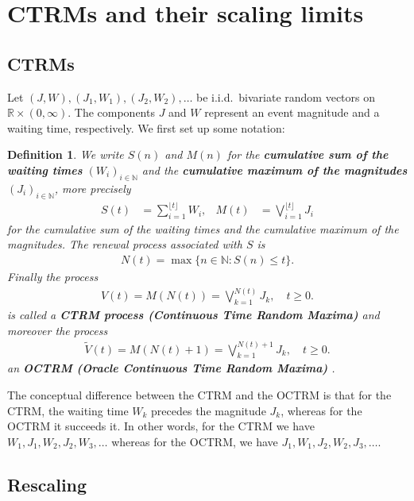 \documentclass[12pt, a4paper]{article}
\newtheorem{definition}[equation]{Definition}
\newcommand{\N}{\mathbb{N}}
\newcommand{\1}{\mathbf 1}
\begin{document}
\section{CTRMs and their scaling limits}

\subsection{CTRMs}

Let $(J,W),(J_1,W_1),(J_2,W_2), \ldots$ 
be i.i.d.\ bivariate random vectors on $\mathbb R \times (0, \infty)$. 
The components $J$ and $W$ represent an event magnitude and 
a waiting time, respectively. 
We first set up some notation: 


\begin{definition}
We write $S(n)$ and $M(n)$ for the \textbf{cumulative sum of the waiting times} $(W_i)_{i \in \N}$ and the \textbf{cumulative maximum of the magnitudes} $(J_i)_{i \in \N}$, more precisely 
\begin{align}
S(t) &= \sum_{i=1}^{\lfloor t \rfloor} W_i, 
&
M(t) &= \bigvee_{i=1}^{\lfloor t \rfloor} J_i
\end{align} 
for the cumulative sum of the waiting times and the cumulative maximum of the 
magnitudes. 
The renewal process associated with $S$ is 
\begin{align} \label{eq:renewal-process}
N(t) = \max\{n \in \mathbb N: S(n) \le t\}.
\end{align}
Finally the process
\begin{align}
V(t) 
= M\left( N(t) \right) 
= \bigvee_{k=1}^{N(t)} J_k, \quad t \ge 0.
\end{align}
is called a \textbf{CTRM process (Continuous Time Random Maxima)} and moreover the process
\begin{align}
\tilde V(t) 
= M\left( N(t) + 1 \right) 
= \bigvee_{k=1}^{N(t) + 1} J_k, \quad t \ge 0.
\end{align}
an \textbf{OCTRM (Oracle Continuous Time Random Maxima)}
.
\end{definition}

The conceptual difference between the CTRM and the OCTRM is that for the CTRM, 
the waiting time $W_k$ precedes the magnitude $J_k$, whereas for 
the OCTRM it succeeds it. In other words, for the CTRM we have 
$W_1, J_1, W_2, J_2, W_3, \ldots$ whereas for the
OCTRM, we have $J_1, W_1, J_2, W_2, J_3, \ldots$. 


\subsection{Rescaling}
\end{document}
